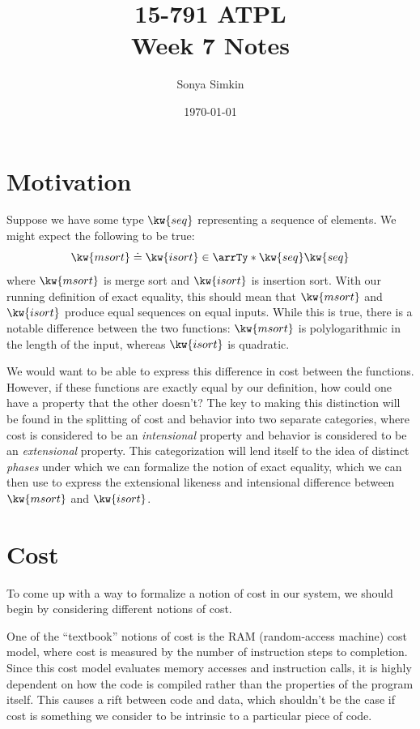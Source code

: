 \documentclass[letterpaper]{article}
\title{15-791 ATPL \\ Week 7 Notes}
\author{Sonya Simkin}
\date{\today}
\begin{document}
\maketitle

\section{Motivation}

Suppose we have some type $\kw{seq}$ representing a sequence of elements. We might expect the following to be true:
\[\exEqOf{\kw{msort}}{\kw{isort}}{\arrTy*{\kw{seq}}{\kw{seq}}}\]
where $\kw{msort}$ is merge sort and $\kw{isort}$ is insertion sort. With our running definition of exact equality,
this should mean that $\kw{msort}$ and $\kw{isort}$ produce equal sequences on equal inputs. While this is true, there is a notable difference
between the two functions: $\kw{msort}$ is polylogarithmic in the length of the input, whereas $\kw{isort}$ is quadratic.

We would want to be able to express this difference in cost between the functions. However, if these functions are exactly equal by our definition, how could
one have a property that the other doesn't? The key to making this distinction will be found in the splitting of cost and behavior into two separate categories, 
where cost is considered to be an \textit{intensional} property and behavior is considered to be an \textit{extensional} property. This categorization will
lend itself to the idea of distinct \textit{phases} under which we can formalize the notion of exact equality, which we can then use to express the extensional likeness
and intensional difference between $\kw{msort}$ and $\kw{isort}$.

\section{Cost}

To come up with a way to formalize a notion of cost in our system, we should begin by considering different notions of cost.

One of the ``textbook'' notions of cost is the RAM (random-access machine) cost model, where cost is measured by the number of instruction steps to completion. 
Since this cost model evaluates memory accesses and instruction calls, it is highly dependent on how the code is compiled rather than the properties of the program itself. This causes a rift between
code and data, which shouldn't be the case if cost is something we consider to be intrinsic to a particular piece of code.
\end{document}
